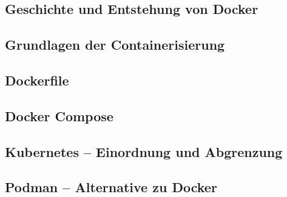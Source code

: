 
\subsection{Geschichte und Entstehung von Docker}


\subsection{Grundlagen der Containerisierung}


\subsection{Dockerfile}


\subsection{Docker Compose}


\subsection{Kubernetes – Einordnung und Abgrenzung}


\subsection{Podman – Alternative zu Docker}
